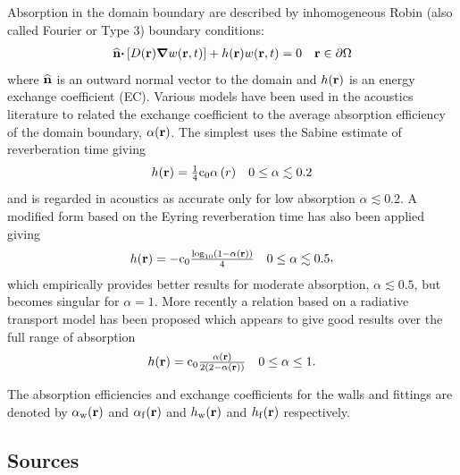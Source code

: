 \documentclass[a4paper]{article}
\numberwithin{equation}{section}
\begin{document}
Absorption in the domain boundary are described by inhomogeneous Robin (also
called Fourier or Type 3) boundary conditions:
\begin{align}
\begin{matrix}
\widehat{\boldsymbol{\mathrm{n}}}\boldsymbol{\mathrm{\cdot}}\left[D(\boldsymbol{\mathrm{r}})\boldsymbol{\mathrm{\nabla}} w(\boldsymbol{\mathrm{r}},t)\right] + h(\boldsymbol{\mathrm{r}}) w(\boldsymbol{\mathrm{r}},t) = 0 &\boldsymbol{\mathrm{r}}\in\partial\Omega
\end{matrix}
\end{align}
where $\widehat{\boldsymbol{\mathrm{n}}}$ is an outward normal vector to the domain and 
$h(\boldsymbol{\mathrm{r}})$ is an energy exchange coefficient (EC). Various models have been
used in the acoustics literature to related the exchange coefficient to the
average absorption efficiency of the domain boundary, $\alpha(\boldsymbol{\mathrm{r}})$. The
simplest uses the Sabine estimate of reverberation time giving
\begin{align}
\begin{matrix}
h(\boldsymbol{\mathrm{r}}) = \frac{1}{4}\mathrm{c}_0\alpha \left(r\right)&0\leq\alpha\lesssim 0.2
\end{matrix}
\end{align}
and is regarded in acoustics as accurate only for low absorption $\alpha\lesssim 0.2$. 
A modified form based on the Eyring reverberation time has also been applied giving
\begin{align}
\begin{matrix}
h(\boldsymbol{\mathrm{r}}) = -\mathrm{c}_0\frac{\log_{10}\left(1-\alpha(\boldsymbol{\mathrm{r}})\right)}{4} &0\leq\alpha\lesssim 0.5
\end{matrix},
\end{align}
which empirically provides better results for moderate absorption, $\alpha\lesssim 0.5$, 
but becomes singular for $\alpha=1$. More recently a relation based on
a radiative transport model has been proposed which appears to give good
results over the full range of absorption
\begin{align}
\begin{matrix}
h(\boldsymbol{\mathrm{r}}) =\mathrm{c}_0\frac{\alpha(\boldsymbol{\mathrm{r}})}{2\left(2-\alpha(\boldsymbol{\mathrm{r}})\right)} & 0\leq\alpha\leq 1 .
\end{matrix}
\end{align}

The absorption efficiencies and exchange coefficients for the walls and fittings
are denoted by $\alpha_{\mathrm{w}}(\boldsymbol{\mathrm{r}})$ and $\alpha_{\mathrm{f}}(\boldsymbol{\mathrm{r}})$ and 
$h_{\mathrm{w}}(\boldsymbol{\mathrm{r}})$ and $h_{\mathrm{f}}(\boldsymbol{\mathrm{r}})$ respectively.

\subsection[Sources]{Sources}
\label{sc:sum:src}
\end{document}
